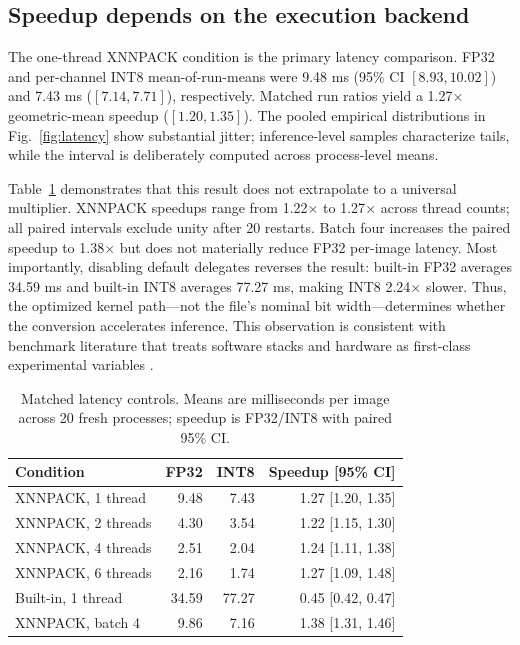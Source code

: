 \subsection{Speedup depends on the execution backend}

The one-thread XNNPACK condition is the primary latency comparison. FP32 and per-channel INT8 mean-of-run-means were 9.48 ms (95\% CI $[8.93,10.02]$) and 7.43 ms ($[7.14,7.71]$), respectively. Matched run ratios yield a 1.27$\times$ geometric-mean speedup ($[1.20,1.35]$). The pooled empirical distributions in Fig.~\ref{fig:latency} show substantial jitter; inference-level samples characterize tails, while the interval is deliberately computed across process-level means.

Table~\ref{tab:latency} demonstrates that this result does not extrapolate to a universal multiplier. XNNPACK speedups range from 1.22$\times$ to 1.27$\times$ across thread counts; all paired intervals exclude unity after 20 restarts. Batch four increases the paired speedup to 1.38$\times$ but does not materially reduce FP32 per-image latency. Most importantly, disabling default delegates reverses the result: built-in FP32 averages 34.59 ms and built-in INT8 averages 77.27 ms, making INT8 2.24$\times$ slower. Thus, the optimized kernel path---not the file's nominal bit width---determines whether the conversion accelerates inference. This observation is consistent with benchmark literature that treats software stacks and hardware as first-class experimental variables \cite{reddi2020mlperf,reddi2020mobile,banbury2021mlperf}.

\begin{table}[t]
\centering
\caption{Matched latency controls. Means are milliseconds per image across 20 fresh processes; speedup is FP32/INT8 with paired 95\% CI.}
\label{tab:latency}
\setlength{\tabcolsep}{3.2pt}
\begin{tabular}{lrrr}
\toprule
\textbf{Condition} & \textbf{FP32} & \textbf{INT8} & \textbf{Speedup [95\% CI]}\\
\midrule
XNNPACK, 1 thread & 9.48 & 7.43 & 1.27 [1.20, 1.35]\\
XNNPACK, 2 threads & 4.30 & 3.54 & 1.22 [1.15, 1.30]\\
XNNPACK, 4 threads & 2.51 & 2.04 & 1.24 [1.11, 1.38]\\
XNNPACK, 6 threads & 2.16 & 1.74 & 1.27 [1.09, 1.48]\\
Built-in, 1 thread & 34.59 & 77.27 & 0.45 [0.42, 0.47]\\
XNNPACK, batch 4 & 9.86 & 7.16 & 1.38 [1.31, 1.46]\\
\bottomrule
\end{tabular}
\end{table}

